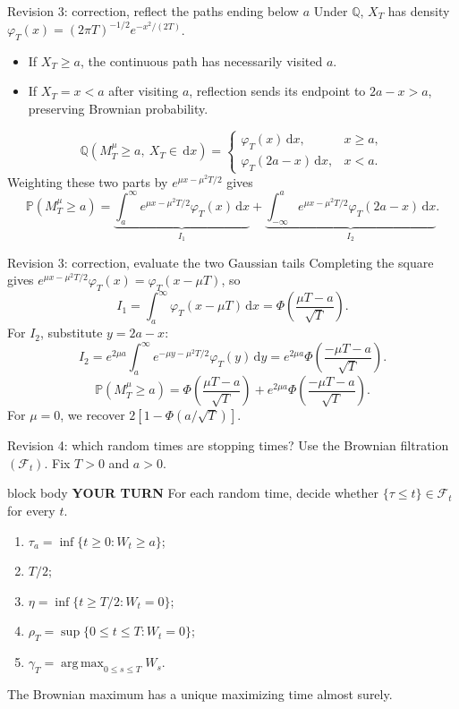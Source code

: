 \documentclass[handout,10pt,aspectratio=169]{beamer}
\newenvironment{pausebox}{\begin{beamercolorbox}[rounded=true,sep=0.8em,wd=\textwidth]{block body}
  \textbf{\color{CourseGold}YOUR TURN}\quad}{\end{beamercolorbox}}
\newcommand{\dd}{\,\mathrm d}
\newcommand{\Pp}{\mathbb P}
\newcommand{\Q}{\mathbb Q}
\newcommand{\cF}{\mathcal F}
\newcommand{\1}{\mathbf 1}
\begin{document}
\begin{frame}{Revision 3: correction, reflect the paths ending below \(a\)}
Under \(\Q\), \(X_T\) has density
\(\varphi_T(x)=(2\pi T)^{-1/2}e^{-x^2/(2T)}\).
\begin{itemize}
  \item If \(X_T\ge a\), the continuous path has necessarily visited \(a\).
  \item If \(X_T=x<a\) after visiting \(a\), reflection sends its endpoint to
        \(2a-x>a\), preserving Brownian probability.
\end{itemize}
\[
\Q(M_T^\mu\ge a,\ X_T\in\dd x)
=\begin{cases}
\varphi_T(x)\dd x,&x\ge a,\\
\varphi_T(2a-x)\dd x,&x<a.
\end{cases}
\]
Weighting these two parts by \(e^{\mu x-\mu^2T/2}\) gives
\[
\Pp(M_T^\mu\ge a)
=\underbrace{\int_a^\infty e^{\mu x-\mu^2T/2}\varphi_T(x)\dd x}_{I_1}
+\underbrace{\int_{-\infty}^a e^{\mu x-\mu^2T/2}
\varphi_T(2a-x)\dd x}_{I_2}.
\]
\end{frame}

\begin{frame}{Revision 3: correction, evaluate the two Gaussian tails}
Completing the square gives
\(e^{\mu x-\mu^2T/2}\varphi_T(x)=\varphi_T(x-\mu T)\), so
\[
I_1=\int_a^\infty\varphi_T(x-\mu T)\dd x
=\Phi\!\left(\frac{\mu T-a}{\sqrt T}\right).
\]
For \(I_2\), substitute \(y=2a-x\):
\[
I_2=e^{2\mu a}\int_a^\infty e^{-\mu y-\mu^2T/2}\varphi_T(y)\dd y
=e^{2\mu a}\Phi\!\left(\frac{-\mu T-a}{\sqrt T}\right).
\]
\[
\boxed{\Pp(M_T^\mu\ge a)
=\Phi\!\left(\frac{\mu T-a}{\sqrt T}\right)
+e^{2\mu a}\Phi\!\left(\frac{-\mu T-a}{\sqrt T}\right).}
\]
For \(\mu=0\), we recover \(2[1-\Phi(a/\sqrt T)]\).
\end{frame}

\begin{frame}{Revision 4: which random times are stopping times?}
Use the Brownian filtration \((\cF_t)\). Fix \(T>0\) and \(a>0\).
\begin{pausebox}
For each random time, decide whether \(\{\tau\le t\}\in\cF_t\) for every \(t\).
\end{pausebox}
\begin{enumerate}
  \item \(\tau_a=\inf\{t\ge0:W_t\ge a\}\);
  \item \(T/2\);
  \item \(\eta=\inf\{t\ge T/2:W_t=0\}\);
  \item \(\rho_T=\sup\{0\le t\le T:W_t=0\}\);
  \item \(\gamma_T=\operatorname*{arg\,max}_{0\le s\le T}W_s\).
\end{enumerate}
The Brownian maximum has a unique maximizing time almost surely.
\end{frame}
\end{document}
